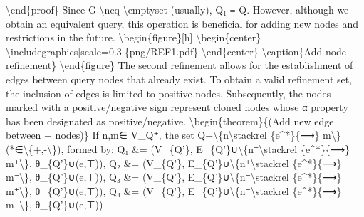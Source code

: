 \documentclass{article}%
\begin{document}
\textbackslash{}end\{proof\}\newline%
\newline%
Since G \textbackslash{}neq \textbackslash{}emptyset (usually), Q₁ ≡ Q. However, although we obtain an equivalent query, this operation is beneficial for adding new nodes and restrictions in the future.\newline%
\newline%
\textbackslash{}begin\{figure\}{[}h{]}\newline%
\textbackslash{}begin\{center\}\newline%
\textbackslash{}includegraphics{[}scale=0.3{]}\{png/REF1.pdf\}\newline%
\textbackslash{}end\{center\}\newline%
\textbackslash{}caption\{Add node refinement\}\newline%
\textbackslash{}end\{figure\}\newline%
\newline%
The second refinement allows for the establishment of edges between query nodes that already exist. To obtain a valid refinement set, the inclusion of edges is limited to positive nodes. Subsequently, the nodes marked with a positive/negative sign represent cloned nodes whose α property has been designated as positive/negative.\newline%
\newline%
\textbackslash{}begin\{theorem\}\{(Add new edge between + nodes)\}\newline%
If n,m∈ V\_Q⁺, the set Q+\textbackslash{}\{n\textbackslash{}stackrel \{e\^{}*\}\{⟶\} m\textbackslash{}\} (*∈\textbackslash{}\{+,{-}\textbackslash{}\}), formed by:\newline%
\newline%
Q₁ \&= (V\_\{Q'\}, E\_\{Q'\}∪\textbackslash{}\{n⁺\textbackslash{}stackrel \{e\^{}*\}\{⟶\} m⁺\textbackslash{}\}, θ\_\{Q'\}∪(e,⊤)),\newline%
\newline%
Q₂ \&= (V\_\{Q'\}, E\_\{Q'\}∪\textbackslash{}\{n⁺\textbackslash{}stackrel \{e\^{}*\}\{⟶\} m⁻\textbackslash{}\}, θ\_\{Q'\}∪(e,⊤)),\newline%
\newline%
Q₃ \&= (V\_\{Q'\}, E\_\{Q'\}∪\textbackslash{}\{n⁻\textbackslash{}stackrel \{e\^{}*\}\{⟶\} m⁺\textbackslash{}\}, θ\_\{Q'\}∪(e,⊤)),\newline%
\newline%
Q₄ \&= (V\_\{Q'\}, E\_\{Q'\}∪\textbackslash{}\{n⁻\textbackslash{}stackrel \{e\^{}*\}\{⟶\} m⁻\textbackslash{}\}, θ\_\{Q'\}∪(e,⊤))\newline%
\end{document}
